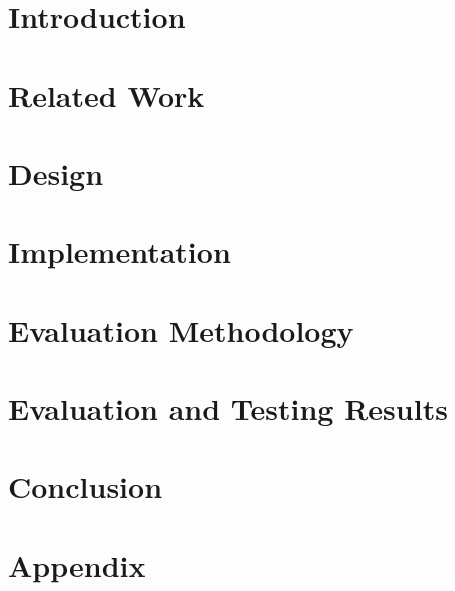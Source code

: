 \documentclass{report}
\begin{document}


\tableofcontents

\chapter{Introduction}
\label{chapter:introduction}


\chapter{Related Work}
\label{chapter:relatedWork}


\chapter{Design}
\label{chapter:design}


\chapter{Implementation}
\label{chapter:implementation}


\chapter{Evaluation Methodology}
\label{chapter:evaluation_methodology}


\chapter{Evaluation and Testing Results}
\label{chapter:results}


\chapter{Conclusion}
\label{chapter:conclusion}


\appendix
\chapter{Appendix}
\label{chapter:appendix}





\printbibliography
\end{document}

